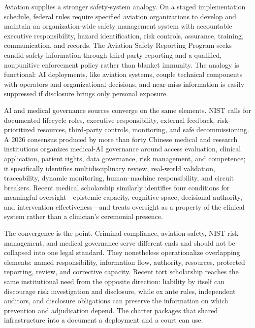 Aviation supplies a stronger safety-system analogy. On a staged implementation schedule, federal rules require specified aviation organizations to develop and maintain an organization-wide safety management system with accountable executive responsibility, hazard identification, risk controls, assurance, training, communication, and records. The Aviation Safety Reporting Program seeks candid safety information through third-party reporting and a qualified, nonpunitive enforcement policy rather than blanket immunity. The analogy is functional: AI deployments, like aviation systems, couple technical components with operators and organizational decisions, and near-miss information is easily suppressed if disclosure brings only personal exposure.

AI and medical governance sources converge on the same elements. NIST calls for documented lifecycle roles, executive responsibility, external feedback, risk-prioritized resources, third-party controls, monitoring, and safe decommissioning. A 2026 consensus produced by more than forty Chinese medical and research institutions organizes medical-AI governance around access evaluation, clinical application, patient rights, data governance, risk management, and competence; it specifically identifies multidisciplinary review, real-world validation, traceability, dynamic monitoring, human--machine responsibility, and circuit breakers. Recent medical scholarship similarly identifies four conditions for meaningful oversight---epistemic capacity, cognitive space, decisional authority, and intervention effectiveness---and treats oversight as a property of the clinical system rather than a clinician's ceremonial presence.

The convergence is the point. Criminal compliance, aviation safety, NIST risk management, and medical governance serve different ends and should not be collapsed into one legal standard. They nonetheless operationalize overlapping elements: named responsibility, information flow, authority, resources, protected reporting, review, and corrective capacity. Recent tort scholarship reaches the same institutional need from the opposite direction: liability by itself can discourage risk investigation and disclosure, while ex ante rules, independent auditors, and disclosure obligations can preserve the information on which prevention and adjudication depend. The charter packages that shared infrastructure into a document a deployment and a court can use.

